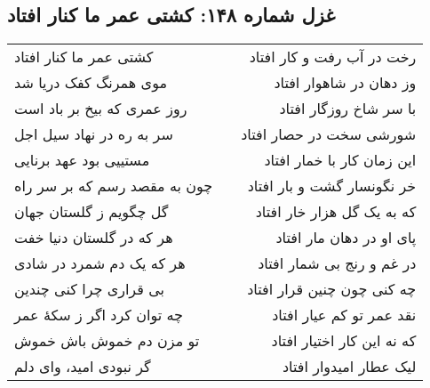\begin{center}
\section*{غزل شماره ۱۴۸: کشتی عمر ما کنار افتاد}
\label{sec:148}
\begin{longtable}{l p{0.5cm} r}
کشتی عمر ما کنار افتاد
&&
رخت در آب رفت و کار افتاد
\\
موی همرنگ کفک دریا شد
&&
وز دهان در شاهوار افتاد
\\
روز عمری که بیخ بر باد است
&&
با سر شاخ روزگار افتاد
\\
سر به ره در نهاد سیل اجل
&&
شورشی سخت در حصار افتاد
\\
مستییی بود عهد برنایی
&&
این زمان کار با خمار افتاد
\\
چون به مقصد رسم که بر سر راه
&&
خر نگونسار گشت و بار افتاد
\\
گل چگویم ز گلستان جهان
&&
که به یک گل هزار خار افتاد
\\
هر که در گلستان دنیا خفت
&&
پای او در دهان مار افتاد
\\
هر که یک دم شمرد در شادی
&&
در غم و رنج بی شمار افتاد
\\
بی قراری چرا کنی چندین
&&
چه کنی چون چنین قرار افتاد
\\
چه توان کرد اگر ز سکهٔ عمر
&&
نقد عمر تو کم عیار افتاد
\\
تو مزن دم خموش باش خموش
&&
که نه این کار اختیار افتاد
\\
گر نبودی امید، وای دلم
&&
لیک عطار امیدوار افتاد
\\
\end{longtable}
\end{center}
